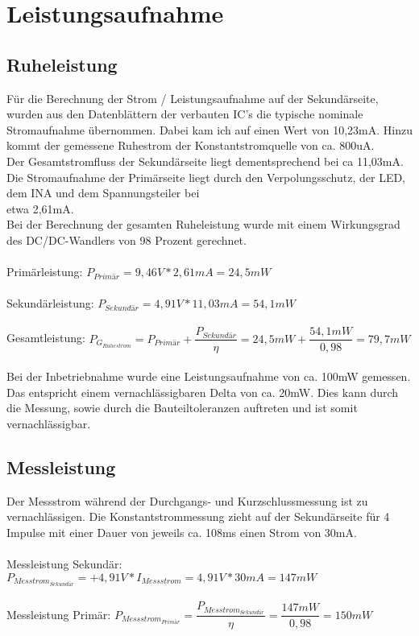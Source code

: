 \section{Leistungsaufnahme}

\subsection{Ruheleistung}
Für die Berechnung der Strom / Leistungsaufnahme auf der Sekundärseite, wurden aus den Datenblättern der verbauten IC's die typische nominale Stromaufnahme übernommen. Dabei kam ich auf einen Wert von 10,23mA. Hinzu kommt der gemessene Ruhestrom der Konstantstromquelle von ca. 800uA. 
\\
Der Gesamtstromfluss der Sekundärseite liegt dementsprechend bei ca 11,03mA.
\\
Die Stromaufnahme der Primärseite liegt durch den Verpolungsschutz, der LED, dem INA und dem Spannungsteiler bei\\ etwa 2,61mA. 
\\
Bei der Berechnung der gesamten Ruheleistung wurde mit einem Wirkungsgrad des DC/DC-Wandlers von 98 Prozent gerechnet. 
\\
\\
Primärleistung: $P_{Primär} = 9,46V * 2,61mA = 24,5mW$
\\
\\
Sekundärleistung: $P_{Sekundär} = 4,91V * 11,03mA = 54,1mW$
\\
\\
Gesamtleistung: $P_{G_{Ruhestrom}} = P_{Primär} + \dfrac{P_{Sekundär}}{\eta} = 24,5mW + \dfrac{54,1mW}{0,98} = 79,7mW$
\\
\\
Bei der Inbetriebnahme wurde eine Leistungsaufnahme von ca. 100mW gemessen. Das entspricht einem vernachlässigbaren Delta von ca. 20mW. Dies kann durch die Messung, sowie durch die Bauteiltoleranzen auftreten und ist somit vernachlässigbar.

\subsection{Messleistung}

Der Messstrom während der Durchgangs- und Kurzschlussmessung ist zu vernachlässigen. Die Konstantstrommessung zieht auf der Sekundärseite für 4 Impulse mit einer Dauer von jeweils ca. 108ms einen Strom von 30mA.
\\
\\
Messleistung Sekundär: $P_{Messtrom_{Sekundär}} = +4,91V * I_{Messstrom} = 4,91V * 30mA = 147mW$
\\
\\
Messleistung Primär: $P_{Messstrom_{Primär}} = \dfrac{P_{Messtrom_{Sekundär}}}{\eta} = \dfrac{147mW}{0,98} = 150mW$


